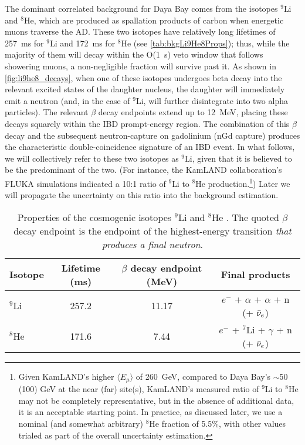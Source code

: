 \documentclass[../thesis.tex]{subfiles}
\begin{document}
The dominant correlated background for Daya Bay comes from the isotopes $^9$Li and $^8$He, which are produced as spallation products of carbon when energetic muons traverse the AD. These two isotopes have relatively long lifetimes of 257~ms for $^9$Li and 172~ms for $^8$He \cite{ENDF} (see \autoref{tab:bkgLi9He8Props}); thus, while the majority of them will decay within the O(1~s) veto window that follows showering muons, a non-negligible fraction will survive past it. As shown in \autoref{fig:li9he8_decays}, when one of these isotopes undergoes beta decay into the relevant excited states of the daughter nucleus, the daughter will immediately emit a neutron (and, in the case of $^9$Li, will further disintegrate into two alpha particles). The relevant $\beta$ decay endpoints extend up to 12~MeV, placing these decays squarely within the IBD prompt-energy region. The combination of this $\beta$ decay and the subsequent neutron-capture on gadolinium (nGd capture) produces the characteristic double-coincidence signature of an IBD event. In what follows, we will collectively refer to these two isotopes as $^9$Li, given that it is believed to be the predominant of the two. (For instance, the KamLAND collaboration's FLUKA simulations \cite{KamLAND_cosmo} indicated a 10:1 ratio of $^9$Li to $^8$He production.\label{par:kamland_he8}\footnote{Given KamLAND's higher $\langle E_\mu \rangle$ of 260~GeV, compared to Daya Bay's $\sim$50 (100) GeV at the near (far) site(s), KamLAND's measured ratio of $^9$Li to $^8$He may not be completely representative, but in the absence of additional data, it is an acceptable starting point. In practice, as discussed later, we use a nominal (and somewhat arbitrary) $^8$He fraction of 5.5\%, with other values trialed as part of the overall uncertainty estimation.}) Later we will propagate the uncertainty on this ratio into the background estimation. 

\begin{table}[h]
  \begin{tabular}{lccc}
    \toprule
    Isotope & Lifetime (ms) & $\beta$ decay endpoint (MeV) & Final products \\
    \midrule
    $^9$Li & 257.2 & 11.17 & $e^-$ + $\alpha$ + $\alpha$ + n (+ $\bar\nu_e$)\\
    $^8$He & 171.6 & 7.44 & $e^-$ + $^7$Li  + $\gamma$ + n (+ $\bar\nu_e$)\\
    \bottomrule
  \end{tabular}
  \caption{Properties of the cosmogenic isotopes $^9$Li and $^8$He \cite{ENDF}. The quoted $\beta$ decay endpoint is the endpoint of the highest-energy transition \emph{that produces a final neutron}.}
  \label{tab:bkgLi9He8Props}
\end{table}
\end{document}
